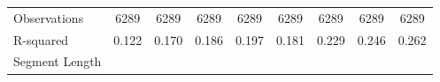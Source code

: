 {\begin{tabular}{l*{8}{c}}
\midrule
Observations        &        6289         &        6289         &        6289         &        6289         &        6289         &        6289         &        6289         &        6289         \\
R-squared           &       0.122         &       0.170         &       0.186         &       0.197         &       0.181         &       0.229         &       0.246         &       0.262         \\
Segment Length      &                     &                     &                     &                     &                     &                     &                     &                     \\
\bottomrule
\end{tabular}
}
